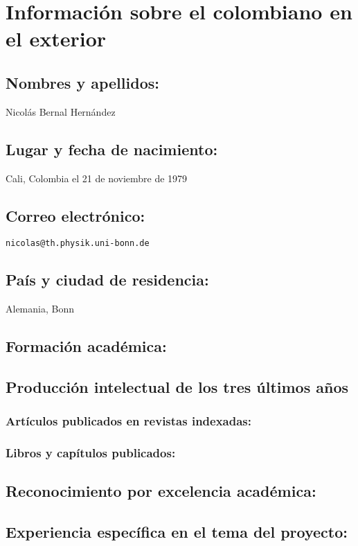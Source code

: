 \section{Información sobre el colombiano en el exterior}
\subsection{Nombres y apellidos: }
Nicolás Bernal Hernández
\subsection{Lugar y fecha de nacimiento: }
Cali, Colombia el  21 de noviembre de 1979
\subsection{Correo electrónico: }
\texttt{nicolas@th.physik.uni-bonn.de}
\subsection{País y ciudad de residencia: }
Alemania, Bonn
\subsection{Formación académica:}
\subsection{Producción intelectual de los tres últimos años}
\subsubsection{Artículos publicados en revistas indexadas:}
\subsubsection{Libros y capítulos publicados:}
\subsection{Reconocimiento por excelencia académica:}
\subsection{Experiencia específica en el tema del proyecto:}
